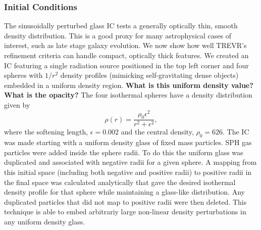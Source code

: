 \documentclass[fleq,usenatbib]{mnras}
\newcommand{\acro}{TREVR}
\newcommand{\comment}[1]{\textbf{\color{red}#1}}
\begin{document}
{\subsubsection{Initial Conditions}
The sinusoidally perturbed glass IC tests a generally optically thin, smooth 
density distribution. This is a good proxy for many astrophysical cases of 
interest, such as late stage galaxy evolution.  We now show how well \acro{}'s 
refinement criteria can handle compact, optically thick features.   We created 
an IC featuring a single radiation source positioned in the top left corner 
and four spheres with $1/r^2$ density profiles (mimicking self-gravitating dense objects)
embedded in a uniform density region. \comment{What is this uniform density value?  What is the opacity?}
The four isothermal spheres have a 
density distribution given by
\begin{equation}
\rho(r) = \frac{\rho_0 \epsilon^2}{r^2 + \epsilon^2},
\end{equation}
where the softening length, $\epsilon=0.002$ and the central density, 
$\rho_0=626$.  The IC was made starting with a uniform density glass of fixed mass particles.
SPH gas particles were added inside the sphere radii.
To do this the uniform glass was duplicated and associated with negative radii for a given sphere.
A mapping from this initial space (including both negative and positive radii) to positive
radii in the final space was calculated analytically
that gave the desired isothermal density profile for that sphere
while maintaining a glass-like distribution.
Any duplicated particles that did not map to positive radii were then deleted.
This technique is able to embed arbitrariy large non-linear density
perturbations in any uniform density glass.

}
\end{document}

